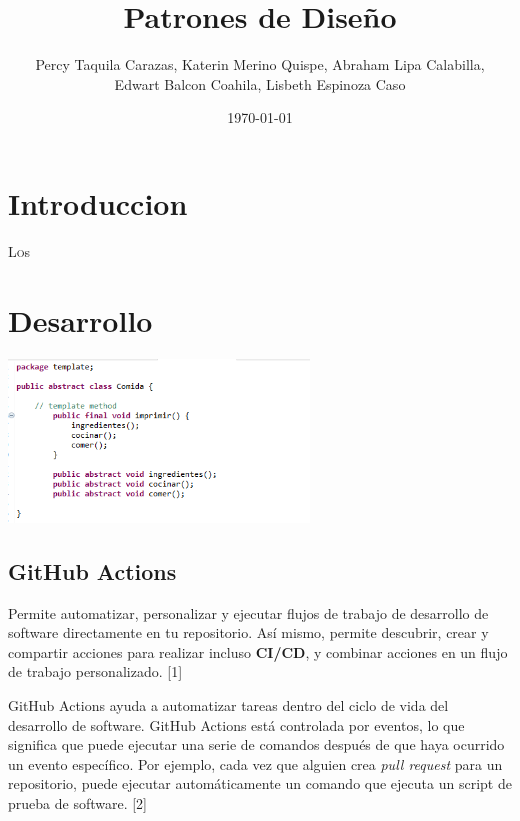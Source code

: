\documentclass[twoside,twocolumn]{article}
\title{Patrones de Diseño}
\author{Percy Taquila Carazas, Katerin Merino Quispe, Abraham Lipa Calabilla,
\\Edwart Balcon Coahila, Lisbeth Espinoza Caso}
\date{\today}
\begin{document}
\maketitle


\section{Introduccion}

\lettrine[nindent=0em,lines=3]{L}os





\section{Desarrollo}




\includegraphics[width=8cm]{Imagenes/imagen}

\subsection{GitHub Actions}

Permite automatizar, personalizar y ejecutar flujos de trabajo de desarrollo de software directamente en tu repositorio. Así mismo, permite descubrir, crear y compartir acciones para realizar incluso \textbf{CI/CD}, y combinar acciones en un flujo de trabajo personalizado. [1]

GitHub Actions ayuda a automatizar tareas dentro del ciclo de vida del desarrollo de software. GitHub Actions está controlada por eventos, lo que significa que puede ejecutar una serie de comandos después de que haya ocurrido un evento específico. Por ejemplo, cada vez que alguien crea \textit{pull request} para un repositorio, puede ejecutar automáticamente un comando que ejecuta un script de prueba de software. [2]
\end{document}
